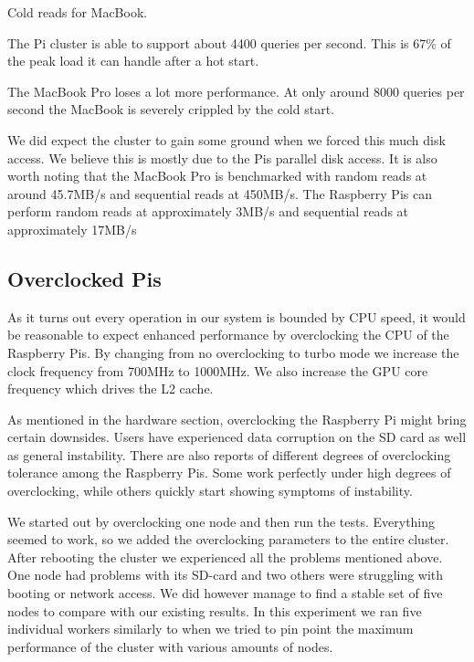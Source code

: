 \begin{table}[h]
	\coldreadmac
	\centering

	\pgfplotstabletypeset[
     	columns={orps, oanswers},
     	every head row/.style={after row=\hline},
		every last row/.style={after row=\hline},
		columns/orps/.style={column name=Queries per second},
		columns/oanswers/.style={column name=\% queries served},
     	]
    {\coldreadmac}
    \caption{Cold reads for MacBook.}
\label{tab:coldread_mac}
\end{table}

The Pi cluster is able to support about 4400 queries per second. This is 67\% of the peak load it can handle after a hot start.

The MacBook Pro loses a lot more performance. At only around 8000 queries per second the MacBook is severely crippled by the cold start. 


We did expect the cluster to gain some ground when we forced this much disk access. We believe this is mostly due to the Pis parallel disk access. It is also worth noting that the MacBook Pro is benchmarked with random reads at around 45.7MB/s and sequential reads at 450MB/s. The Raspberry Pis can perform random reads at approximately 3MB/s and sequential reads at approximately 17MB/s


\subsection{Overclocked Pis}
As it turns out every operation in our system is bounded by CPU speed, it would be reasonable to expect enhanced performance by overclocking the CPU of the Raspberry Pis.
By changing from no overclocking to turbo mode we increase the clock frequency from 700MHz to 1000MHz. We also increase the GPU core frequency which drives the L2 cache.

As mentioned in the hardware section, overclocking the Raspberry Pi might bring certain downsides. Users have experienced data corruption on the SD card as well as general instability. There are also reports of different degrees of overclocking tolerance among the Raspberry Pis. Some work perfectly under high degrees of overclocking, while others quickly start showing symptoms of instability.

We started out by overclocking one node and then run the tests. Everything seemed to work, so we added the overclocking parameters to the entire cluster. After rebooting the cluster we experienced all the problems mentioned above. One node had problems with its SD-card and two others were struggling with booting or network access. We did however manage to find a stable set of five nodes to compare with our existing results. In this experiment we ran five individual workers similarly to when we tried to pin point the maximum performance of the cluster with various amounts of nodes.


